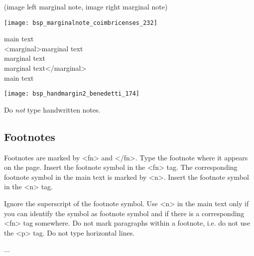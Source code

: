 \begin{example} (image left marginal note, image right marginal note)

\texttt{[image: bsp\_marginalnote\_coimbricenses\_232]} 

\begin{typeLatin}
main text \\
<marginal>marginal text\\
marginal text \\
marginal text</marginal> \\
main text
\end{typeLatin}

\end{example}


\begin{exception}

\texttt{[image: bsp\_handmargin2\_benedetti\_174]} 

Do \emph{not} type handwritten notes.
\end{exception}


\subsection{Footnotes}

\begin{mainrule}
Footnotes are marked by <fn> and </fn>. Type the footnote where it appears on the page. Insert the footnote symbol in the <fn> tag. The corresponding footnote symbol in the main text is marked by <n>. Insert the footnote symbol in the <n> tag.
\end{mainrule}

\begin{clarification}
Ignore the superscript of the footnote symbol. Use <n> in the main text only if you can identify the symbol as footnote symbol and if there is a corresponding <fn> tag somewhere. Do not mark paragraphs within a footnote, i.e. do not use the <p> tag. Do not type horizontal lines.
\end{clarification}

\begin{example}
...
\end{example}

